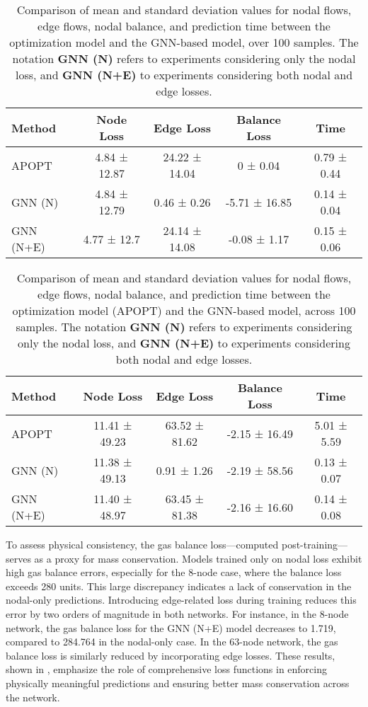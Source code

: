 \begin{table}
    \centering
    \begin{tabular}{|l|c|c|c|c|}
        \hline
        Method & Node Loss & Edge Loss & Balance Loss & Time \\ \hline
        APOPT & 4.84 ± 12.87 & 24.22 ± 14.04 & 0 ± 0.04 & 0.79 ± 0.44 \\ \hline
        GNN (N) & 4.84 ± 12.79 & 0.46 ± 0.26 & -5.71 ± 16.85 & 0.14 ± 0.04 \\ \hline
        GNN (N+E) & 4.77 ± 12.7 & 24.14 ± 14.08 & -0.08 ± 1.17 & 0.15 ± 0.06 \\ \hline
    \end{tabular}
    \caption{Comparison of mean and standard deviation values for nodal flows, edge flows, nodal balance, and prediction time between the optimization model and the GNN-based model, over 100 samples. The notation \textbf{GNN (N)} refers to experiments considering only the nodal loss, and \textbf{GNN (N+E)} to experiments considering both nodal and edge losses.}
    \label{tab:lineal_dummy_results}
\end{table}


\begin{table}
    \centering
    \begin{tabular}{|l|c|c|c|c|}
    \hline
    Method & Node Loss & Edge Loss & Balance Loss & Time \\ \hline
    APOPT & 11.41 ± 49.23 & 63.52 ± 81.62 & -2.15 ± 16.49 & 5.01 ± 5.59 \\ \hline
    GNN (N) & 11.38 ± 49.13 & 0.91 ± 1.26 & -2.19 ± 58.56 & 0.13 ± 0.07 \\ \hline
    GNN (N+E) & 11.40 ± 48.97 & 63.45 ± 81.38 & -2.16 ± 16.60 & 0.14 ± 0.08 \\ \hline
\end{tabular}
\caption{Comparison of mean and standard deviation values for nodal flows, edge flows, nodal balance, and prediction time between the optimization model (APOPT) and the GNN-based model, across 100 samples. The notation \textbf{GNN (N)} refers to experiments considering only the nodal loss, and \textbf{GNN (N+E)} to experiments considering both nodal and edge losses.}
\label{tab:lineal_col_results}
\end{table}


To assess physical consistency, the gas balance loss—computed post-training—serves as a proxy for mass conservation. Models trained only on nodal loss exhibit high gas balance errors, especially for the 8-node case, where the balance loss exceeds 280 units. This large discrepancy indicates a lack of conservation in the nodal-only predictions. Introducing edge-related loss during training reduces this error by two orders of magnitude in both networks. For instance, in the 8-node network, the gas balance loss for the GNN (N+E) model decreases to 1.719, compared to 284.764 in the nodal-only case. In the 63-node network, the gas balance loss is similarly reduced by incorporating edge losses. These results, shown in , emphasize the role of comprehensive loss functions in enforcing physically meaningful predictions and ensuring better mass conservation across the network.

